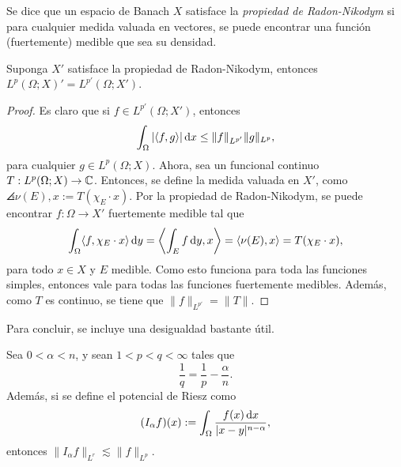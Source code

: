 \begin{definition}
	Se dice que un espacio de Banach $X$ satisface la \textit{propiedad de Radon-Nikodym} si para cualquier medida valuada en vectores, se puede encontrar una función (fuertemente) medible que sea su densidad.
\end{definition}
\begin{theorem}
	Suponga $X'$ satisface la propiedad de Radon-Nikodym, entonces $L^p(\Omega; X)' = L^{p'}(\Omega;X')$.
\end{theorem}
\begin{proof}
	Es claro que si $f\in L^{p'}(\Omega;X')$, entonces 
	\begin{equation*}
		\int_\Omega |\langle f, g\rangle|\mathop{}\!\mathrm{d} x \leq \|f\|_{L^{p'}}\|g\|_{L^p},
	\end{equation*}
	para cualquier $g\in L^p(\Omega;X)$. Ahora, sea un funcional continuo $T:L^p(\Omega; X)\to\mathbb{C}$. Entonces, se define la medida valuada en $X'$, como $\angles{\nu(E), x} := T(\chi_E\cdot x)$. Por la propiedad de Radon-Nikodym, se puede encontrar $f:\Omega\to X'$ fuertemente medible tal que 
	\begin{equation*}
		\int_\Omega \langle f, \chi_E\cdot x\rangle \mathop{}\!\mathrm{d} y = \left\langle\int_E f\mathop{}\!\mathrm{d} y, x\right\rangle = \langle\nu(E), x\rangle = T(\chi_E \cdot x),
	\end{equation*}
	para todo $x\in X$ y $E$ medible. Como esto funciona para toda las funciones simples, entonces vale para todas las funciones fuertemente medibles. Además, como $T$ es continuo, se tiene que $\|f\|_{L^{p'}} = \|T\|$.
\end{proof}
Para concluir, se incluye una desigualdad bastante útil.
\begin{theorem}
	Sea $0<\alpha<n$, y sean $1<p<q<\infty$ tales que 
	\begin{equation*}
		\frac{1}{q} = \frac{1}{p} - \frac{\alpha}{n}.
	\end{equation*}
	Además, si se define el potencial de Riesz como 
	\begin{equation*}
		(I_\alpha f)(x) := \int_{\Omega} \frac{f(x)\mathop{}\!\mathrm{d} x}{|x-y|^{n-\alpha}},
	\end{equation*}
	entonces $\|I_\alpha f\|_{L^r} \lesssim \|f\|_{L^p}$.
\end{theorem}
